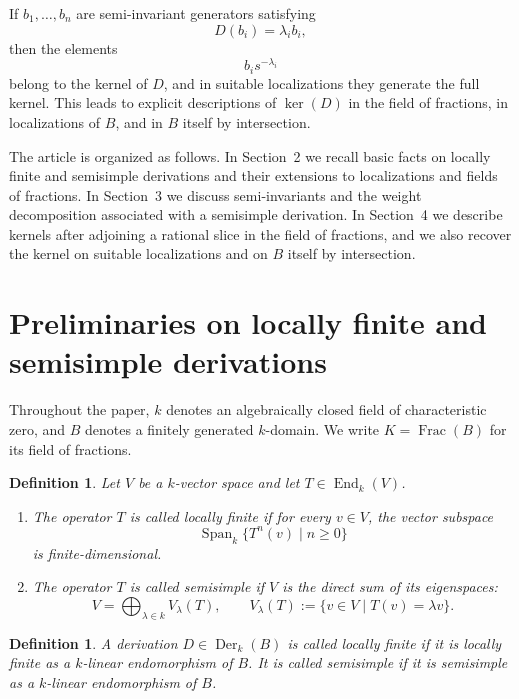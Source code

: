\documentclass[12pt]{amsart}
\newtheorem{definition}[theorem]{Definition}
\newcommand{\Der}{\operatorname{Der}}
\newcommand{\End}{\operatorname{End}}
\newcommand{\Frac}{\operatorname{Frac}}
\newcommand{\Span}{\operatorname{Span}}
\begin{document}
If $b_1,\dots,b_n$ are semi-invariant generators satisfying
\[
D(b_i)=\lambda_i b_i,
\]
then the elements
\[
b_i s^{-\lambda_i}
\]
belong to the kernel of $D$, and in suitable localizations they generate the full kernel. This leads to explicit descriptions of $\ker(D)$ in the field of fractions, in localizations of $B$, and in $B$ itself by intersection.

The article is organized as follows. In Section~2 we recall basic facts on locally finite and semisimple derivations and their extensions to localizations and fields of fractions. In Section~3 we discuss semi-invariants and the weight decomposition associated with a semisimple derivation. In Section~4 we describe kernels after adjoining a rational slice in the field of fractions, and we also recover the kernel on suitable localizations and on $B$ itself by intersection.

\section{Preliminaries on locally finite and semisimple derivations}

Throughout the paper, $k$ denotes an algebraically closed field of characteristic zero, and $B$ denotes a finitely generated $k$-domain. We write $K=\Frac(B)$ for its field of fractions.

\begin{definition}
Let $V$ be a $k$-vector space and let $T\in \End_k(V)$.
\begin{enumerate}[label=\textup{(\arabic*)}]
    \item The operator $T$ is called \emph{locally finite} if for every $v\in V$, the vector subspace
    \[
    \Span_k\{T^n(v)\mid n\geq 0\}
    \]
    is finite-dimensional.

    \item The operator $T$ is called \emph{semisimple} if $V$ is the direct sum of its eigenspaces:
    \[
    V=\bigoplus_{\lambda\in k} V_\lambda(T),
    \qquad
    V_\lambda(T):=\{v\in V\mid T(v)=\lambda v\}.
    \]
\end{enumerate}
\end{definition}

\begin{definition}
A derivation $D\in \Der_k(B)$ is called \emph{locally finite} if it is locally finite as a $k$-linear endomorphism of $B$. It is called \emph{semisimple} if it is semisimple as a $k$-linear endomorphism of $B$.
\end{definition}
\end{document}
